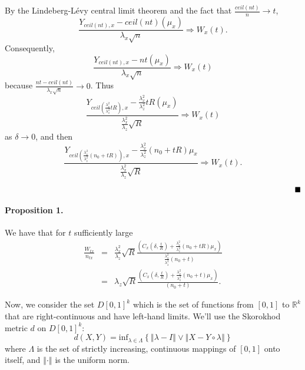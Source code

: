 \documentclass[12pt,english]{article}
\begin{document}
By the Lindeberg-Lévy central limit theorem and the fact that $\frac{ceil\left(nt\right)}{n}\rightarrow t$,
\[
\frac{Y_{ceil\left(nt\right),x}-ceil\left(nt\right)\left(\mu_{x}\right)}{\lambda_{x}\sqrt{n}}\Rightarrow W_{x}\left(t\right).
\]
Consequently,
\[
\frac{Y_{ceil\left(nt\right),x}-nt\left(\mu_{x}\right)}{\lambda_{x}\sqrt{n}}\Rightarrow W_{x}\left(t\right)
\]
because $\frac{nt-ceil\left(nt\right)}{\lambda_{x}\sqrt{n}}\rightarrow0$.
Thus
\[
\frac{Y_{ceil\left(\frac{\lambda_{x}^{2}}{\lambda_{z}^{2}}tR\right),x}-\frac{\lambda_{x}^{2}}{\lambda_{z}^{2}}tR\left(\mu_{x}\right)}{\frac{\lambda_{x}^{2}}{\lambda_{z}}\sqrt{R}}\Rightarrow W_{x}\left(t\right)
\]
as $\delta\rightarrow0$, and then
\[
\frac{Y_{ceil\left(\frac{\lambda_{x}^{2}}{\lambda_{z}^{2}}\left(n_{0}+tR\right)\right),x}-\frac{\lambda_{x}^{2}}{\lambda_{z}^{2}}\left(n_{0}+tR\right)\mu_{x}}{\frac{\lambda_{x}^{2}}{\lambda_{z}}\sqrt{R}}\Rightarrow W_{x}\left(t\right).
\]


$\;\;\;\;\;\;\;\;\;\;\;\;\;\;\;\;\;\;\;\;\;\;\;\;\;\;\;\;\;\;\;\;\;\;\;\;\;\;\;\;\;\;\;\;\;\;\;\;\;\;\;\;\;\;\;\;\;\;\;\;\;\;\;\;\;\;\;\;\;\;\;\;\;\;\;\;\;\;\;\;\;\;\;\;\;\;\;\;\;\;\;\;\;\;\;\;\;\;\;\;\;\;\;\;\;\;\;\;\;\;\;\;\;\;\;\;\;\;\;\;\;\;\;\;\;\;\;\;\;\;\;\;\;\;\;\;\;\;\;\text{\ensuremath{\blacksquare}}$


\paragraph*{Proposition 1.}

We have that for $t$ sufficiently large
\begin{eqnarray*}
\frac{W_{tx}}{n_{tx}} & = & \frac{\lambda_{x}^{2}}{\lambda_{z}}\sqrt{R}\frac{\left(C_{x}\left(\delta,\frac{t}{R}\right)+\frac{\lambda_{x}^{2}}{\lambda_{z}^{2}}\left(n_{0}+tR\right)\mu_{x}\right)}{\frac{\lambda_{x}^{2}}{\lambda_{z}^{2}}\left(n_{0}+t\right)}\\
 & = & \lambda_{z}\sqrt{R}\frac{\left(C_{x}\left(\delta,\frac{t}{R}\right)+\frac{\lambda_{x}^{2}}{\lambda_{z}^{2}}\left(n_{0}+t\right)\mu_{x}\right)}{\left(n_{0}+t\right)}.
\end{eqnarray*}


Now, we consider the set $D\left[0,1\right]^{k}$ which is the set
of functions from $\left[0,1\right]$ to $\mathbb{R}^{k}$ that are
right-continuous and have left-hand limits. We'll use the Skorokhod
metric $d$ on $D\left[0,1\right]^{k}$:
\[
d\left(X,Y\right)=\mbox{inf}_{\lambda\in\Lambda}\left\{ \left\Vert \lambda-I\right\Vert \vee\left\Vert X-Y\circ\lambda\right\Vert \right\} 
\]
where $\Lambda$ is the set of strictly increasing, continuous mappings
of $\left[0,1\right]$ onto itself, and $\left\Vert \cdot\right\Vert $
is the uniform norm. 
\end{document}
